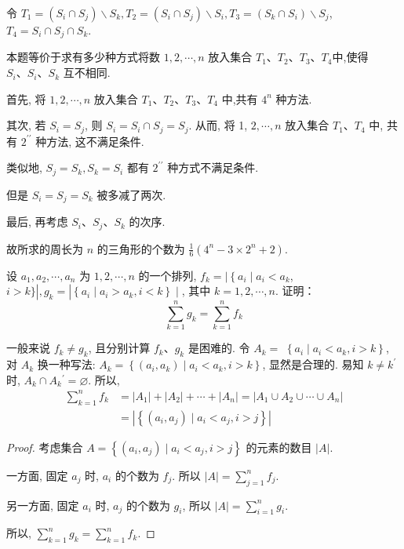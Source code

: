 \begin{solution}
	令 $T_{1}=\left(S_{i} \cap S_{j}\right) \backslash S_{k}, T_{2}=\left(S_{i} \cap S_{j}\right) \backslash S_{i}, T_{3}=\left(S_{k} \cap S_{i}\right) \backslash S_{j}$, $T_{4}=S_{i} \cap S_{j} \cap S_{k}$.

	本题等价于求有多少种方式将数 $1,2, \cdots, n$ 放入集合 $T_{1} 、 T_{2} 、 T_{3} 、 T_{4}$中,使得 $S_{i} 、 S_{i} 、 S_{k}$ 互不相同.

	首先, 将 $1,2, \cdots, n$ 放入集合 $T_{1} 、 T_{2} 、 T_{3} 、 T_{4}$ 中,共有 $4^{n}$ 种方法.

	其次, 若 $S_{i}=S_{j}$, 则 $S_{i}=S_{i} \cap S_{j}=S_{j}$. 从而, 将 1, $2, \cdots, n$ 放入集合 $T_{1} 、 T_{4}$ 中, 共有 $2^{\prime \prime}$ 种方法, 这不满足条件.

	类似地, $S_{j}=S_{k}, S_{k}=S_{i}$ 都有 $2^{\prime \prime}$ 种方式不满足条件.

	但是 $S_{i}=S_{j}=S_{k}$ 被多减了两次.

	最后, 再考虑 $S_{i} 、 S_{j} 、 S_{k}$ 的次序.

	故所求的周长为 $n$ 的三角形的个数为 $\frac{1}{6}\left(4^{n}-3 \times 2^{n}+2\right)$.
\end{solution}

\begin{example}
	设 $a_{1}, a_{2}, \cdots, a_{n}$ 为 $1,2, \cdots, n$ 的一个排列, $f_{k}=\mid\left\{a_{i} \mid a_{i}<a_{k}\right.$, $i>k\}\left|, g_{k}=\right|\left\{a_{i} \mid a_{i}>a_{k}, i<k\right\} \mid$, 其中 $k=1,2, \cdots, n$. 证明：
	$$
		\sum_{k=1}^{n} g_{k}=\sum_{k=1}^{n} f_{k}
	$$
\end{example}

\begin{analysis}
	一般来说 $f_{k} \neq g_{k}$, 且分别计算 $f_{k} 、 g_{k}$ 是困难的. 令 $A_{k}=$ $\left\{a_{i} \mid a_{i}<a_{k}, i>k\right\}$, 对 $A_{k}$ 换一种写法: $A_{k}=\left\{\left(a_{i}, a_{k}\right) \mid a_{i}<a_{k}, i>k\right\}$, 显然是合理的. 易知 $k \neq k^{\prime}$ 时, $A_{k} \cap A_{k}{ }^{\prime}=\varnothing$. 所以,
	$$
		\begin{aligned}
			\sum_{k=1}^{n} f_{k} & =\left|A_{1}\right|+\left|A_{2}\right|+\cdots+\left|A_{n}\right|=\left|A_{1} \cup A_{2} \cup \cdots \cup A_{n}\right| \\
			                     & =\left|\left\{\left(a_{i}, a_{j}\right) \mid a_{i}<a_{j}, i>j\right\}\right|
		\end{aligned}
	$$
\end{analysis}

\begin{proof}
	考虑集合 $A=\left\{\left(a_{i}, a_{j}\right) \mid a_{i}<a_{j}, i>j\right\}$ 的元素的数目 $|A|$.

	一方面, 固定 $a_{j}$ 时, $a_{i}$ 的个数为 $f_{j}$. 所以 $|A|=\sum_{j=1}^{n} f_{j}$.

	另一方面, 固定 $a_{i}$ 时, $a_{j}$ 的个数为 $g_{i}$, 所以 $|A|=\sum_{i=1}^{n} g_{i}$.

	所以, $\sum_{k=1}^{n} g_{k}=\sum_{k=1}^{n} f_{k}$.
\end{proof}

